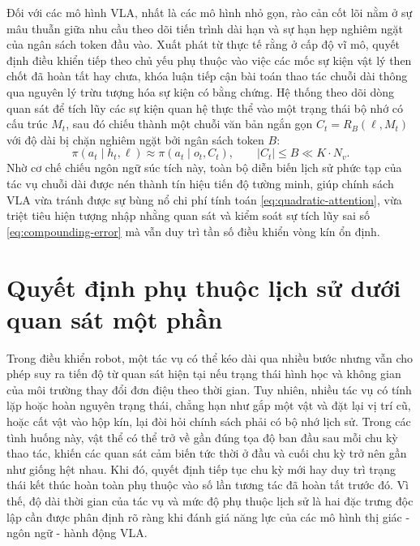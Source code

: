 Đối với các mô hình VLA, nhất là các mô hình nhỏ gọn, rào cản cốt lõi nằm ở sự mâu thuẫn giữa nhu cầu theo dõi tiến trình dài hạn và sự hạn hẹp nghiêm ngặt của ngân sách token đầu vào. Xuất phát từ thực tế rằng ở cấp độ vĩ mô, quyết định điều khiển tiếp theo chủ yếu phụ thuộc vào việc các mốc sự kiện vật lý then chốt đã hoàn tất hay chưa, khóa luận tiếp cận bài toán thao tác chuỗi dài thông qua nguyên lý trừu tượng hóa sự kiện có bằng chứng. Hệ thống theo dõi dòng quan sát để tích lũy các sự kiện quan hệ thực thể vào một trạng thái bộ nhớ có cấu trúc $M_t$, sau đó chiếu thành một chuỗi văn bản ngắn gọn $C_t = R_B(\ell, M_t)$ với độ dài bị chặn nghiêm ngặt bởi ngân sách token $B$:
\begin{equation}
\pi(a_t \mid h_t, \ell) \approx \pi(a_t \mid o_t, C_t), \qquad |C_t| \le B \ll K \cdot N_v.
\label{eq:event-projection-policy}
\end{equation}
Nhờ cơ chế chiếu ngôn ngữ súc tích này, toàn bộ diễn biến lịch sử phức tạp của tác vụ chuỗi dài được nén thành tín hiệu tiến độ tường minh, giúp chính sách VLA vừa tránh được sự bùng nổ chi phí tính toán \eqref{eq:quadratic-attention}, vừa triệt tiêu hiện tượng nhập nhằng quan sát và kiểm soát sự tích lũy sai số \eqref{eq:compounding-error} mà vẫn duy trì tần số điều khiển vòng kín ổn định.

\section{Quyết định phụ thuộc lịch sử dưới quan sát một phần}
\label{sec:pomdp}

Trong điều khiển robot, một tác vụ có thể kéo dài qua nhiều bước nhưng vẫn cho phép suy ra tiến độ từ quan sát hiện tại nếu trạng thái hình học và không gian của môi trường thay đổi đơn điệu theo thời gian. Tuy nhiên, nhiều tác vụ có tính lặp hoặc hoàn nguyên trạng thái, chẳng hạn như gắp một vật và đặt lại vị trí cũ, hoặc cất vật vào hộp kín, lại đòi hỏi chính sách phải có bộ nhớ lịch sử. Trong các tình huống này, vật thể có thể trở về gần đúng tọa độ ban đầu sau mỗi chu kỳ thao tác, khiến các quan sát cảm biến tức thời ở đầu và cuối chu kỳ trở nên gần như giống hệt nhau. Khi đó, quyết định tiếp tục chu kỳ mới hay duy trì trạng thái kết thúc hoàn toàn phụ thuộc vào số lần tương tác đã hoàn tất trước đó. Vì thế, độ dài thời gian của tác vụ và mức độ phụ thuộc lịch sử là hai đặc trưng độc lập cần được phân định rõ ràng khi đánh giá năng lực của các mô hình thị giác - ngôn ngữ - hành động VLA.

